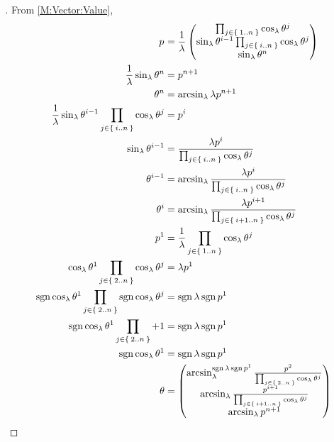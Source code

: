 \documentclass[../main.tex]{subfiles}
\begin{document}
\begin{proof}[]
From \cref{M:Vector:Value},
\begin{align*}
\tensor{p}{}
&=\frac{1}{\lambda}
\begin{pmatrix}
\prod_{j\in\Set{1..n}}{\cos_\lambda{\tensor{\theta}{^j}}}\\
\sin_\lambda{\tensor{\theta}{^{i-1}}}\prod_{j\in\Set{i..n}}{\cos_\lambda{\tensor{\theta}{^j}}}\\
\sin_\lambda{{\tensor{\theta}{^n}}}\\
\end{pmatrix}\\
\frac{1}{\lambda}\sin_\lambda{{\tensor{\theta}{^n}}}&=\tensor{p}{^{n+1}}\\
\tensor{\theta}{^n}&=\arcsin_\lambda{\lambda\tensor{p}{^{n+1}}}\\
\frac{1}{\lambda}\sin_\lambda{\tensor{\theta}{^{i-1}}}\prod_{j\in\Set{i..n}}{\cos_\lambda{\tensor{\theta}{^j}}}&=\tensor{p}{^{i}}\\
\sin_\lambda{\tensor{\theta}{^{i-1}}}&=\frac{\lambda\tensor{p}{^{i}}}{\prod_{j\in\Set{i..n}}{\cos_\lambda{\tensor{\theta}{^j}}}}\\
\tensor{\theta}{^{i-1}}&=\arcsin_\lambda{\frac{\lambda\tensor{p}{^{i}}}{\prod_{j\in\Set{i..n}}{\cos_\lambda{\tensor{\theta}{^j}}}}}\\
\tensor{\theta}{^i}&=\arcsin_\lambda{\frac{\lambda\tensor{p}{^{i+1}}}{\prod_{j\in\Set{i+1..n}}{\cos_\lambda{\tensor{\theta}{^j}}}}}\\
\tensor{p}{^1}&=\frac{1}{\lambda}\prod_{j\in\Set{1..n}}{\cos_\lambda{\tensor{\theta}{^j}}}\\
\cos_\lambda{\tensor{\theta}{^1}}\prod_{j\in\Set{2..n}}{\cos_\lambda{\tensor{\theta}{^j}}}&=\lambda\tensor{p}{^1}\\
\sign\cos_\lambda{\tensor{\theta}{^1}}\prod_{j\in\Set{2..n}}\sign{\cos_\lambda{\tensor{\theta}{^j}}}&=\sign\lambda\sign\tensor{p}{^1}\\
\sign\cos_\lambda{\tensor{\theta}{^1}}\prod_{j\in\Set{2..n}}{+1}&=\sign\lambda\sign\tensor{p}{^1}\\
\sign\cos_\lambda{\tensor{\theta}{^1}}&=\sign\lambda\sign\tensor{p}{^1}\\
\theta&=\begin{pmatrix}
\arcsin_\lambda^{\sign\lambda\sign{\tensor{p}{^1}}}{\frac{\tensor{p}{^2}}{\prod_{j\in\Set{2..n}}{\cos_\lambda{\tensor{\theta}{^j}}}}}\\
\arcsin_\lambda{\frac{\tensor{p}{^{i+1}}}{\prod_{j\in\Set{i+1..n}}{\cos_\lambda{\tensor{\theta}{^j}}}}}\\
\arcsin_\lambda{\tensor{p}{^{n+1}}}\\
\end{pmatrix}
\end{align*}
\end{proof}
\end{document}

